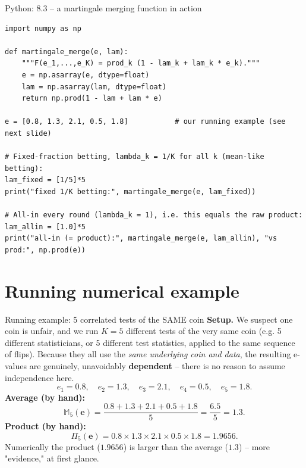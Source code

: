 \documentclass[aspectratio=169,10pt]{beamer}
\begin{document}
\begin{frame}[fragile]{Python: 8.3 -- a martingale merging function in action}
  \begin{lstlisting}
import numpy as np

def martingale_merge(e, lam):
    """F(e_1,...,e_K) = prod_k (1 - lam_k + lam_k * e_k)."""
    e = np.asarray(e, dtype=float)
    lam = np.asarray(lam, dtype=float)
    return np.prod(1 - lam + lam * e)

e = [0.8, 1.3, 2.1, 0.5, 1.8]           # our running example (see next slide)

# Fixed-fraction betting, lambda_k = 1/K for all k (mean-like betting):
lam_fixed = [1/5]*5
print("fixed 1/K betting:", martingale_merge(e, lam_fixed))

# All-in every round (lambda_k = 1), i.e. this equals the raw product:
lam_allin = [1.0]*5
print("all-in (= product):", martingale_merge(e, lam_allin), "vs prod:", np.prod(e))
  \end{lstlisting}
\end{frame}

\section{Running numerical example}

\begin{frame}{Running example: 5 correlated tests of the SAME coin}
  \textbf{Setup.} We suspect one coin is unfair, and we run $K=5$ different tests of the very same coin (e.g. 5 different statisticians, or 5 different test statistics, applied to the same sequence of flips). Because they all use the \emph{same underlying coin and data}, the resulting e-values are genuinely, unavoidably \textbf{dependent} -- there is no reason to assume independence here.
  \[
    e_1 = 0.8, \quad e_2 = 1.3, \quad e_3 = 2.1, \quad e_4 = 0.5, \quad e_5 = 1.8.
  \]
  \textbf{Average (by hand):}
  \[
    \mathbb{M}_5(\mathbf e) = \frac{0.8+1.3+2.1+0.5+1.8}{5} = \frac{6.5}{5} = 1.3.
  \]
  \textbf{Product (by hand):}
  \[
    \Pi_5(\mathbf e) = 0.8 \times 1.3 \times 2.1 \times 0.5 \times 1.8 = 1.9656.
  \]
  Numerically the product ($1.9656$) is larger than the average ($1.3$) -- more "evidence," at first glance.
\end{frame}
\end{document}
